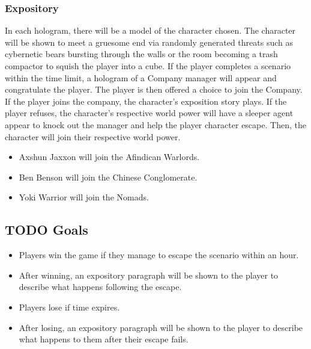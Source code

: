\documentclass[11pt]{article}
\begin{document}
\subsubsection{Expository}
\label{sec:org9905f58}
In each hologram, there will be a model of the character chosen. The character will be shown to meet a gruesome end via randomly generated threats such as cybernetic bears bursting through the walls or the room becoming a trash compactor to squish the player into a cube. If the player completes a scenario within the time limit, a hologram of a Company manager will appear and congratulate the player. The player is then offered a choice to join the Company. If the player joins the company, the character's exposition story plays. If the player refuses, the character's respective world power will have a sleeper agent appear to knock out the manager and help the player character escape. Then, the character will join their respective world power.

\begin{itemize}
\item Axshun Jaxxon will join the Afindican Warlords.

\item Ben Benson will join the Chinese Conglomerate.

\item Yoki Warrior will join the Nomads.
\end{itemize}

\subsection{{\bfseries\sffamily TODO} Goals}
\label{sec:orge2d361f}
\begin{itemize}
\item Players win the game if they manage to escape the scenario within an hour.
\item After winning, an expository paragraph will be shown to the player to describe what happens following the escape.
\item Players lose if time expires.
\item After losing, an expository paragraph will be shown to the player to describe what happens to them after their escape fails.
\end{itemize}
\end{document}
